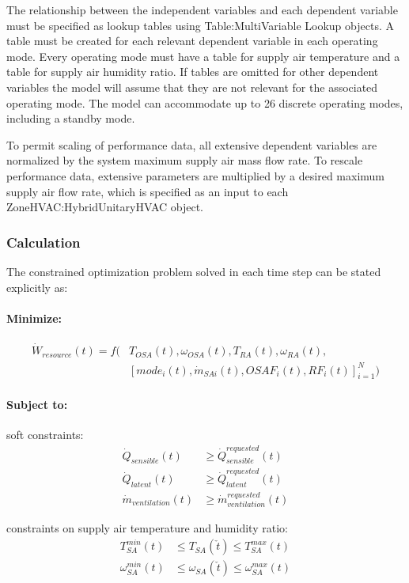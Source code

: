 The relationship between the independent variables and each dependent variable must be specified as lookup tables using Table:MultiVariable Lookup objects. A table must be created for each relevant dependent variable in each operating mode. Every operating mode must have a table for supply air temperature and a table for supply air humidity ratio. If tables are omitted for other dependent variables the model will assume that they are not relevant for the associated operating mode. The model can accommodate up to 26 discrete operating modes, including a standby mode.

To permit scaling of performance data, all extensive dependent variables are normalized by the system maximum supply air mass flow rate.  To rescale performance data, extensive parameters are multiplied by a desired maximum supply air flow rate, which is specified as an input to each ZoneHVAC:HybridUnitaryHVAC object.

\subsubsection{Calculation}

The constrained optimization problem solved in each time step can be stated explicitly as:

\paragraph{Minimize:}
\begin{align}
 \dot{W}_{resource}(t) = f( & T_{OSA}(t), \omega_{OSA}(t), T_{RA}(t), \omega_{RA}(t), \nonumber \\
                            & [ mode_{i}(t), \dot{m}_{SAi}(t), OSAF_{i}(t), RF_{i}(t) ]_{i=1}^{N} )
\end{align}

\paragraph{Subject to:}

soft constraints:
\begin{align}
	\dot{Q}_{sensible}(t) & \geq \dot{Q}_{sensible}^{requested}(t) \\
	\dot{Q}_{latent}(t)   & \geq \dot{Q}_{latent}^{requested}(t) \\
	\dot{m}_{ventilation}(t) & \geq \dot{m}_{ventilation}^{requested}(t)
\end{align}

constraints on supply air temperature and humidity ratio:
\begin{align}
	T_{SA}^{min}(t)      & \leq T_{SA}(\check{t})      \leq T_{SA}^{max}(t) \\
	\omega_{SA}^{min}(t) & \leq \omega_{SA}(\check{t}) \leq \omega_{SA}^{max}(t)
\end{align}
	
